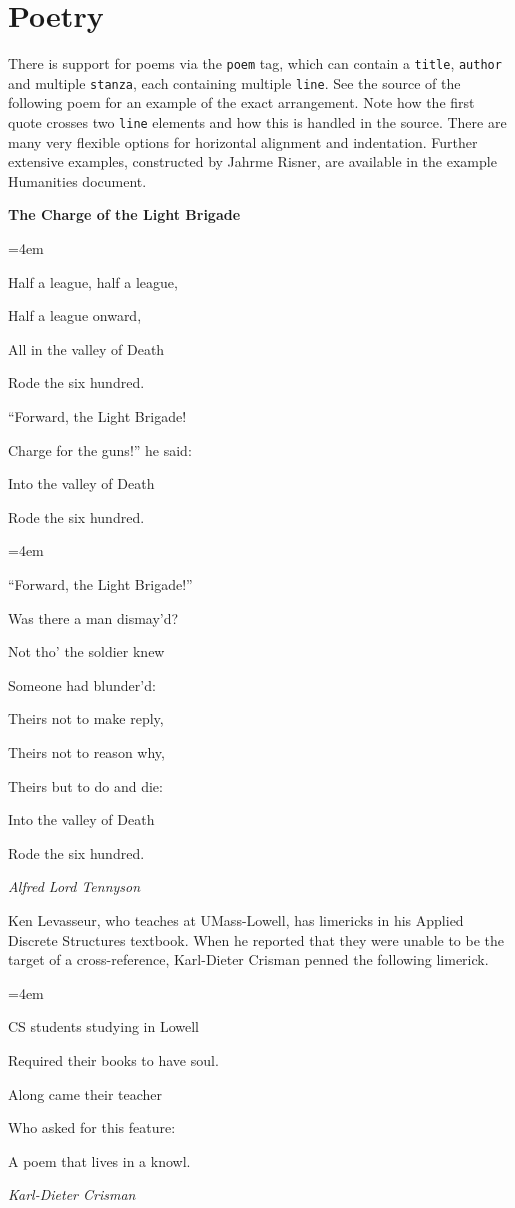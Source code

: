 \documentclass[10pt,]{article}
\theoremstyle{plain}
\theoremstyle{definition}
\theoremstyle{definition}
\theoremstyle{definition}
\theoremstyle{definition}
\theoremstyle{definition}
\theoremstyle{definition}
\numberwithin{equation}{section}
\newenvironment{poem}{\setlength{\parindent}{0em}}{}
\newcommand{\poemTitle}[1]{\begin{center}\large\textbf{#1}\end{center}}
\newenvironment{stanza}{\vspace{0.25 em}\hangindent=4em}{\vspace{1 em}}
\newcommand{\poemauthorleft}[1]{\vspace{-1em}\begin{flushleft}\textit{#1}\end{flushleft}}
\newcommand{\poemlineleft}[1]{{\raggedright{#1}\par}\vspace{-\parskip}}
\begin{document}
\section[{Poetry}]{Poetry}\label{poetry}
\hypertarget{p-755}{}%
There is support for poems via the \lstinline?poem? tag, which can contain a \lstinline?title?, \lstinline?author? and multiple \lstinline?stanza?, each containing multiple \lstinline?line?.  See the source of the following poem for an example of the exact arrangement.  Note how the first quote crosses two \lstinline?line? elements and how this is handled in the source.  There are many very flexible options for horizontal alignment and indentation.  Further extensive examples, constructed by Jahrme Risner, are available in the example Humanities document.%
\begin{poem}\label{poem-light-brigade}
\poemTitle{The Charge of the Light Brigade}
\begin{stanza}
\poemlineleft{Half a league, half a league,}
\poemlineleft{Half a league onward,}
\poemlineleft{All in the valley of Death}
\poemlineleft{Rode the six hundred.}
\poemlineleft{``Forward, the Light Brigade!}
\poemlineleft{Charge for the guns!'' he said:}
\poemlineleft{Into the valley of Death}
\poemlineleft{Rode the six hundred.}
\end{stanza}
\begin{stanza}
\poemlineleft{``Forward, the Light Brigade!''}
\poemlineleft{Was there a man dismay'd?}
\poemlineleft{Not tho' the soldier knew}
\poemlineleft{Someone had blunder'd:}
\poemlineleft{Theirs not to make reply,}
\poemlineleft{Theirs not to reason why,}
\poemlineleft{Theirs but to do and die:}
\poemlineleft{Into the valley of Death}
\poemlineleft{Rode the six hundred.}
\end{stanza}
\poemauthorleft{Alfred Lord Tennyson}
\end{poem}
\hypertarget{p-756}{}%
Ken Levasseur, who teaches at UMass-Lowell, has limericks in his Applied Discrete Structures textbook.  When he reported that they were unable to be the target of a cross-reference, Karl-Dieter Crisman penned the following limerick.%
\begin{poem}\label{poem-10}
\poemTitle{}
\begin{stanza}
\poemlineleft{CS students studying in Lowell}
\poemlineleft{Required their books to have soul.}
\poemlineleft{Along came their teacher}
\poemlineleft{Who asked for this feature:}
\poemlineleft{A poem that lives in a knowl.}
\end{stanza}
\poemauthorleft{Karl-Dieter Crisman}
\end{poem}
\typeout{************************************************}
\typeout{************************************************}
\end{document}
